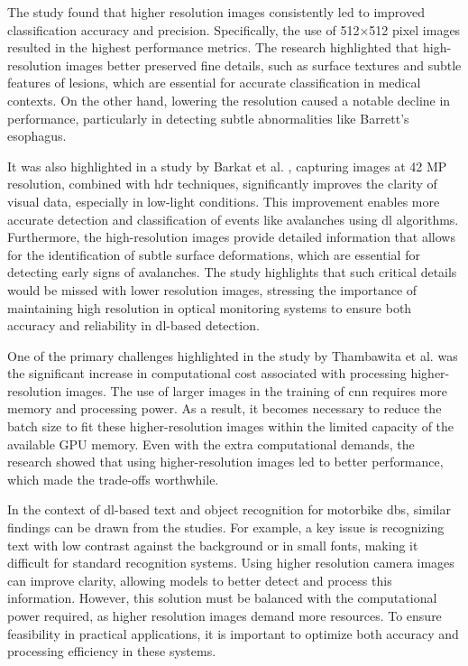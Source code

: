 The study \cite{RES_IMP} found that higher resolution images consistently led to improved classification accuracy and precision. Specifically, the use of 512×512 pixel images resulted in the highest performance metrics. The research highlighted that high-resolution images better preserved fine details, such as surface textures and subtle features of lesions, which are essential for accurate classification in medical contexts. On the other hand, lowering the resolution caused a notable decline in performance, particularly in detecting subtle abnormalities like Barrett’s esophagus.

It was also highlighted in a study by Barkat et al. \cite{RES_HDR_IMP}, capturing images at 42 MP resolution, combined with \gls{hdr} techniques, significantly improves the clarity of visual data, especially in low-light conditions. This improvement enables more accurate detection and classification of events like avalanches using \gls{dl} algorithms. Furthermore, the high-resolution images provide detailed information that allows for the identification of subtle surface deformations, which are essential for detecting early signs of avalanches. The study highlights that such critical details would be missed with lower resolution images, stressing the importance of maintaining high resolution in optical monitoring systems to ensure both accuracy and reliability in \gls{dl}-based detection.

One of the primary challenges highlighted in the study by Thambawita et al. \cite{RES_IMP} was the significant increase in computational cost associated with processing higher-resolution images. The use of larger images in the training of \gls{cnn} requires more memory and processing power. As a result, it becomes necessary to reduce the batch size to fit these higher-resolution images within the limited capacity of the available GPU memory. Even with the extra computational demands, the research showed that using higher-resolution images led to better performance, which made the trade-offs worthwhile.

In the context of \gls{dl}-based text and object recognition for motorbike \gls{db}s, similar findings can be drawn from the studies. For example, a key issue is recognizing text with low contrast against the background or in small fonts, making it difficult for standard recognition systems. Using higher resolution camera images can improve clarity, allowing models to better detect and process this information. However, this solution must be balanced with the computational power required, as higher resolution images demand more resources. To ensure feasibility in practical applications, it is important to optimize both accuracy and processing efficiency in these systems.

